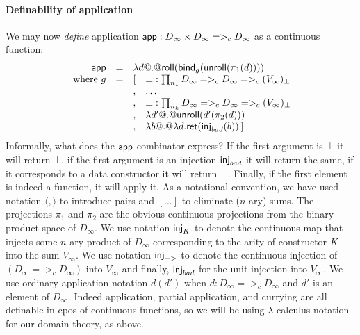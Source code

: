 
\paragraph{Definability of application}
We may now {\em define} application $\mathsf{app} : D_\infty \times D_\infty =>_c D_\infty$ as a continuous
function: 
{\setlength{\arraycolsep}{2pt}
\[\begin{array}{rcll}
   \dapp & = & \multicolumn{2}{l}{\dlambda d @.@ \roll(\bind_g (\unroll (\pi_1(d))))} \\
   \text{ where } g & = &  [ & \bot : \prod_{\ar_1}{D_\infty} =>_c D_\infty =>_c (V_\infty)_\bot \\
                    &   &  , & \ldots \\
                    &   &  , & \bot : \prod_{\ar_k}{D_\infty} =>_c D_\infty =>_c (V_\infty)_\bot \\
                    &   &  , & \dlambda d' @.@ \unroll(d'(\pi_2(d))) \\
                    &   &  , & \dlambda b @.@ \dlambda d. \ret(\inj{bad}(b))\hspace{2pt} ] 
\end{array}\]}%
Informally, what does the $\mathsf{app}$ combinator express? If the first
argument is $\bot$ it will return $\bot$, if the first argument is an
injection $\mathsf{inj}_{bad}$ it will return the same, if it corresponds to a
data constructor it will return $\bot$. Finally, if the first element
is indeed a function, it will apply it.
As a notational convention, we have used notation $\langle , \rangle$ to introduce pairs and $[\ldots]$ to 
eliminate ($n$-ary) sums. 
The projections $\pi_1$ and $\pi_2$ are the obvious continuous projections from the 
binary product space of $D_{\infty}$. We use notation $\mathsf{inj}_{K}$ to denote the continuous map that injects some $n$-ary product of $D_{\infty}$ 
corresponding to the arity of constructor $K$ into the sum $V_{\infty}$.
We use notation $\mathsf{inj}_{->}$ to denote the continuous injection of $(D_{\infty} =>_c D_{\infty})$ into $V_{\infty}$ and finally, 
$\mathsf{inj}_{bad}$ for the unit injection into $V_{\infty}$. We use ordinary application notation 
$d(d')$  when $d : D_\infty =>_c D_\infty$ and
$d'$ is an element of $D_\infty$. 
Indeed application, partial application, and currying are all definable in cpos of continuous functions, 
so we will be using $\lambda$-calculus notation for our domain theory, as above. 

